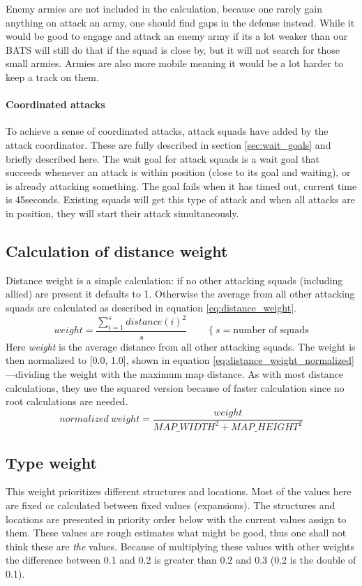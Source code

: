 Enemy armies are not included in the calculation, because one rarely gain anything on attack an army, one should find gaps in the defense instead\cite{day9}. While it would be good to engage and attack an enemy army if its a lot weaker than our BATS will still do that if the squad is close by, but it will not search for those small armies. Armies are also more mobile meaning it would be a lot harder to keep a track on them.

\paragraph{Coordinated attacks}
To achieve a sense of coordinated attacks, attack squads have  added by the attack coordinator. These are fully described in section \ref{sec:wait_goals} and briefly described here. The wait goal for attack squads is a wait goal that succeeds whenever an attack is within position (close to its goal and waiting), or is already attacking something. The goal fails when it has timed out, current time is 45\conf seconds. Existing squads will get this type of attack and when all attacks are in position, they will start their attack simultaneously.

\subsection{Calculation of distance weight}
Distance weight is a simple calculation: if no other attacking squads (including allied) are present it defaults to 1. Otherwise the average from all other attacking squads are calculated as described in equation \ref{eq:distance_weight}.
\begin{equation}
\label{eq:distance_weight}
weight = \frac{\sum_{i=1}^{s}{distance(i)^2}}{s} \qquad \left\{s = \text{number of squads}\right.
\end{equation}
Here \emph{weight} is the average distance from all other attacking squads. The weight is then normalized to [0.0, 1.0], shown in equation \ref{eq:distance_weight_normalized}—dividing the weight with the maximum map distance. As with most distance calculations, they use the squared version because of faster calculation since no root calculations are needed.
\begin{equation}
\label{eq:distance_weight_normalized}
normalized\ weight = \frac{weight}{MAP\_WIDTH^2 + MAP\_HEIGHT^2}
\end{equation}


\subsection{Type weight}
This weight prioritizes different structures and locations. Most of the values here are fixed or calculated between fixed values (expansions). The structures and locations are presented in priority order below with the current values assign to them. These values are rough estimates what might be good, thus one shall not think these are \emph{the} values. Because of multiplying these values with other weights the difference between 0.1 and 0.2 is greater than 0.2 and 0.3 (0.2 is the double of 0.1).

